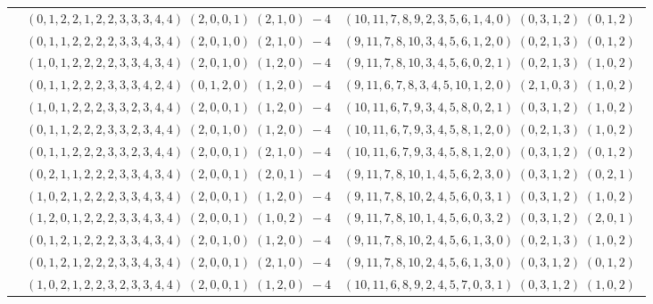 \documentclass[11pt]{article}
\begin{document}
\begin{longtable}[l]{|c|c|c|}
 \cline{2-3} 
 & $(0 ,1 ,2 ,2 ,1 ,2 ,2 ,3 ,3 ,3 ,4 ,4) \;(2 ,0 ,0 ,1) \;(2 ,1 ,0) \;-4$ & $(10 ,11 ,7 ,8 ,9 ,2 ,3 ,5 ,6 ,1 ,4 ,0) \;(0 ,3 ,1 ,2) \;(0 ,1 ,2) \;$\\ 
 \cline{2-3} 
 & $(0 ,1 ,1 ,2 ,2 ,2 ,2 ,3 ,3 ,4 ,3 ,4) \;(2 ,0 ,1 ,0) \;(2 ,1 ,0) \;-4$ & $(9 ,11 ,7 ,8 ,10 ,3 ,4 ,5 ,6 ,1 ,2 ,0) \;(0 ,2 ,1 ,3) \;(0 ,1 ,2) \;$\\ 
 \cline{2-3} 
 & $(1 ,0 ,1 ,2 ,2 ,2 ,2 ,3 ,3 ,4 ,3 ,4) \;(2 ,0 ,1 ,0) \;(1 ,2 ,0) \;-4$ & $(9 ,11 ,7 ,8 ,10 ,3 ,4 ,5 ,6 ,0 ,2 ,1) \;(0 ,2 ,1 ,3) \;(1 ,0 ,2) \;$\\ 
 \cline{2-3} 
 & $(0 ,1 ,1 ,2 ,2 ,2 ,3 ,3 ,3 ,4 ,2 ,4) \;(0 ,1 ,2 ,0) \;(1 ,2 ,0) \;-4$ & $(9 ,11 ,6 ,7 ,8 ,3 ,4 ,5 ,10 ,1 ,2 ,0) \;(2 ,1 ,0 ,3) \;(1 ,0 ,2) \;$\\ 
 \cline{2-3} 
 & $(1 ,0 ,1 ,2 ,2 ,2 ,3 ,3 ,2 ,3 ,4 ,4) \;(2 ,0 ,0 ,1) \;(1 ,2 ,0) \;-4$ & $(10 ,11 ,6 ,7 ,9 ,3 ,4 ,5 ,8 ,0 ,2 ,1) \;(0 ,3 ,1 ,2) \;(1 ,0 ,2) \;$\\ 
 \cline{2-3} 
 & $(0 ,1 ,1 ,2 ,2 ,2 ,3 ,3 ,2 ,3 ,4 ,4) \;(2 ,0 ,1 ,0) \;(1 ,2 ,0) \;-4$ & $(10 ,11 ,6 ,7 ,9 ,3 ,4 ,5 ,8 ,1 ,2 ,0) \;(0 ,2 ,1 ,3) \;(1 ,0 ,2) \;$\\ 
 \cline{2-3} 
 & $(0 ,1 ,1 ,2 ,2 ,2 ,3 ,3 ,2 ,3 ,4 ,4) \;(2 ,0 ,0 ,1) \;(2 ,1 ,0) \;-4$ & $(10 ,11 ,6 ,7 ,9 ,3 ,4 ,5 ,8 ,1 ,2 ,0) \;(0 ,3 ,1 ,2) \;(0 ,1 ,2) \;$\\ 
 \cline{2-3} 
 & $(0 ,2 ,1 ,1 ,2 ,2 ,2 ,3 ,3 ,4 ,3 ,4) \;(2 ,0 ,0 ,1) \;(2 ,0 ,1) \;-4$ & $(9 ,11 ,7 ,8 ,10 ,1 ,4 ,5 ,6 ,2 ,3 ,0) \;(0 ,3 ,1 ,2) \;(0 ,2 ,1) \;$\\ 
 \cline{2-3} 
 & $(1 ,0 ,2 ,1 ,2 ,2 ,2 ,3 ,3 ,4 ,3 ,4) \;(2 ,0 ,0 ,1) \;(1 ,2 ,0) \;-4$ & $(9 ,11 ,7 ,8 ,10 ,2 ,4 ,5 ,6 ,0 ,3 ,1) \;(0 ,3 ,1 ,2) \;(1 ,0 ,2) \;$\\ 
 \cline{2-3} 
 & $(1 ,2 ,0 ,1 ,2 ,2 ,2 ,3 ,3 ,4 ,3 ,4) \;(2 ,0 ,0 ,1) \;(1 ,0 ,2) \;-4$ & $(9 ,11 ,7 ,8 ,10 ,1 ,4 ,5 ,6 ,0 ,3 ,2) \;(0 ,3 ,1 ,2) \;(2 ,0 ,1) \;$\\ 
 \cline{2-3} 
 & $(0 ,1 ,2 ,1 ,2 ,2 ,2 ,3 ,3 ,4 ,3 ,4) \;(2 ,0 ,1 ,0) \;(1 ,2 ,0) \;-4$ & $(9 ,11 ,7 ,8 ,10 ,2 ,4 ,5 ,6 ,1 ,3 ,0) \;(0 ,2 ,1 ,3) \;(1 ,0 ,2) \;$\\ 
 \cline{2-3} 
 & $(0 ,1 ,2 ,1 ,2 ,2 ,2 ,3 ,3 ,4 ,3 ,4) \;(2 ,0 ,0 ,1) \;(2 ,1 ,0) \;-4$ & $(9 ,11 ,7 ,8 ,10 ,2 ,4 ,5 ,6 ,1 ,3 ,0) \;(0 ,3 ,1 ,2) \;(0 ,1 ,2) \;$\\ 
 \cline{2-3} 
 & $(1 ,0 ,2 ,1 ,2 ,2 ,3 ,2 ,3 ,3 ,4 ,4) \;(2 ,0 ,0 ,1) \;(1 ,2 ,0) \;-4$ & $(10 ,11 ,6 ,8 ,9 ,2 ,4 ,5 ,7 ,0 ,3 ,1) \;(0 ,3 ,1 ,2) \;(1 ,0 ,2) \;$\\ 

\end{longtable}
\end{document}
